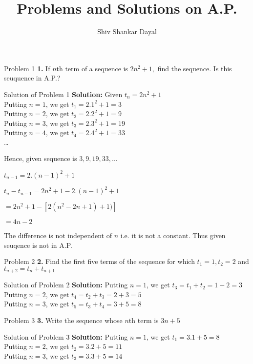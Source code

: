 \documentclass[aspectratio=1610,8pt]{beamer}
\title{Problems and Solutions on A.P.}
\author[Shiv Shankar Dayal]{Shiv Shankar Dayal}
\begin{document}
\begin{frame}
       \titlepage
\end{frame}

\begin{frame}{Problem 1}
  \textbf{1.} If $n$th term of a sequence is $2n^2 + 1,$ find the sequence. Is
  this seuquence in A.P.?
\end{frame}
\begin{frame}{Solution of Problem 1}
  \textbf{Solution:} Given $t_n = 2n^2 + 1$\\
  Putting $n = 1$, we get $t_1 = 2.1^2 + 1 = 3$\\
  Putting $n = 2$, we get $t_2 = 2.2^2 + 1 = 9$\\
  Putting $n = 3$, we get $t_3 = 2.3^2 + 1 = 19$\\
  Putting $n = 4$, we get $t_4 = 2.4^2 + 1 = 33$\\
  \ldots

  Hence, given sequence is $3, 9, 19, 33, \ldots$

  $t_{n - 1} = 2.(n - 1)^2 + 1$

  $t_n - t_{n - 1} = 2n^2 + 1 - 2.(n - 1)^2 + 1$

  $= 2n^2 + 1 - [2(n^2 - 2n + 1) + 1)]$

  $= 4n - 2$

  The difference is not independent of $n$ i.e. it is not a constant. Thus
  given seuqence is not in A.P.
\end{frame}
\begin{frame}{Problem 2}
  \textbf{2.} Find the first five terms of the sequence for which $t_1 = 1, t_2
  = 2$ and $t_{n + 2} = t_n + t_{n + 1}$
\end{frame}
\begin{frame}{Solution of Problem 2}
  \textbf{Solution:} Putting $n = 1$, we get $t_3 = t_1 + t_2 = 1 + 2 = 3$\\
  Putting $n = 2$, we get $t_4 = t_2 + t_3 = 2 + 3 = 5$\\
  Putting $n = 3$, we get $t_5 = t_3 + t_4 = 3 + 5 = 8$\\
\end{frame}
\begin{frame}{Problem 3}
  \textbf{3.} Write the sequence whose $n$th term is $3n + 5$
\end{frame}
\begin{frame}{Solution of Problem 3}
  \textbf{Solution:} Putting $n = 1$, we get $t_1 = 3.1 + 5 = 8$\\
  Putting $n = 2$, we get $t_2 = 3.2 + 5 = 11$\\
  Putting $n = 3$, we get $t_3 = 3.3 + 5 = 14$
\end{frame}
\end{document}
